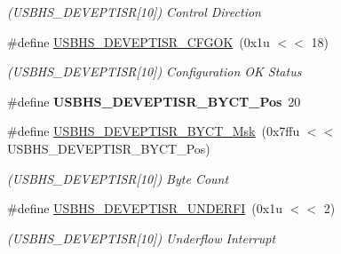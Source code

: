 \begin{DoxyCompactItemize}
\begin{DoxyCompactList}\small\item\em (U\+S\+B\+H\+S\+\_\+\+D\+E\+V\+E\+P\+T\+I\+SR\mbox{[}10\mbox{]}) Control Direction \end{DoxyCompactList}\item 
\mbox{\label{group__SAMV71__USBHS_gab11ea1f5bd0a35cb8ba91d188561bd13}} 
\#define \mbox{\hyperlink{group__SAMV71__USBHS_gab11ea1f5bd0a35cb8ba91d188561bd13}{U\+S\+B\+H\+S\+\_\+\+D\+E\+V\+E\+P\+T\+I\+S\+R\+\_\+\+C\+F\+G\+OK}}~(0x1u $<$$<$ 18)
\begin{DoxyCompactList}\small\item\em (U\+S\+B\+H\+S\+\_\+\+D\+E\+V\+E\+P\+T\+I\+SR\mbox{[}10\mbox{]}) Configuration OK Status \end{DoxyCompactList}\item 
\mbox{\label{group__SAMV71__USBHS_gad6c9e40343f3741743d60f17568c13e0}} 
\#define {\bfseries U\+S\+B\+H\+S\+\_\+\+D\+E\+V\+E\+P\+T\+I\+S\+R\+\_\+\+B\+Y\+C\+T\+\_\+\+Pos}~20
\item 
\mbox{\label{group__SAMV71__USBHS_ga2e48723f821a7a4a14d06945389604f1}} 
\#define \mbox{\hyperlink{group__SAMV71__USBHS_ga2e48723f821a7a4a14d06945389604f1}{U\+S\+B\+H\+S\+\_\+\+D\+E\+V\+E\+P\+T\+I\+S\+R\+\_\+\+B\+Y\+C\+T\+\_\+\+Msk}}~(0x7ffu $<$$<$ U\+S\+B\+H\+S\+\_\+\+D\+E\+V\+E\+P\+T\+I\+S\+R\+\_\+\+B\+Y\+C\+T\+\_\+\+Pos)
\begin{DoxyCompactList}\small\item\em (U\+S\+B\+H\+S\+\_\+\+D\+E\+V\+E\+P\+T\+I\+SR\mbox{[}10\mbox{]}) Byte Count \end{DoxyCompactList}\item 
\mbox{\label{group__SAMV71__USBHS_ga3402a7aff01b4227937cf65febb10cd1}} 
\#define \mbox{\hyperlink{group__SAMV71__USBHS_ga3402a7aff01b4227937cf65febb10cd1}{U\+S\+B\+H\+S\+\_\+\+D\+E\+V\+E\+P\+T\+I\+S\+R\+\_\+\+U\+N\+D\+E\+R\+FI}}~(0x1u $<$$<$ 2)
\begin{DoxyCompactList}\small\item\em (U\+S\+B\+H\+S\+\_\+\+D\+E\+V\+E\+P\+T\+I\+SR\mbox{[}10\mbox{]}) Underflow Interrupt \end{DoxyCompactList}\item 
\mbox{\label{group__SAMV71__USBHS_gadb464c9795a551ffbc5f8caf82a300f4}} 
$$
\end{DoxyCompactItemize}
